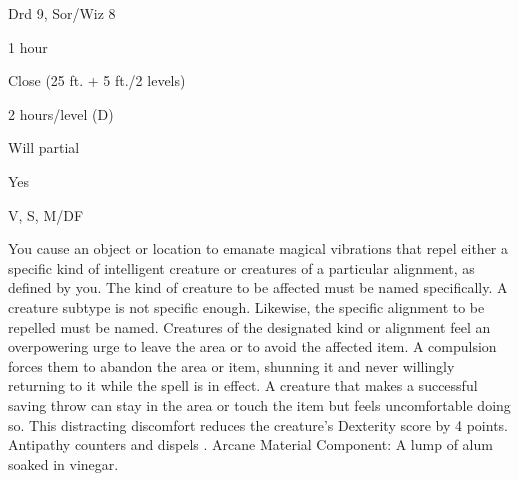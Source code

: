 
\begin{description*}
\item[Level:] Drd 9, Sor/Wiz 8
\item[Casting Time:] 1 hour
\item[Range:] Close (25 ft. + 5 ft./2 levels)
\item[Duration:] 2 hours/level (D)
\item[Saving Throw:] Will partial
\item[Spell Resistance:] Yes
\item[Components:] V, S, M/DF
\end{description*}

You cause an object or location to emanate magical vibrations that repel either
a specific kind of intelligent creature or creatures of a particular alignment,
as defined by you. The kind of creature to be affected must be named specifically.
A creature subtype is not specific enough. Likewise, the specific alignment to
be repelled must be named.
Creatures of the designated kind or alignment feel an overpowering urge to leave
the area or to avoid the affected item.
A compulsion forces them to abandon the area or item, shunning it and never willingly
returning to it while the spell is in effect. A creature that makes a successful
saving throw can stay in the area or touch the item but feels uncomfortable doing
so. This distracting discomfort reduces the creature's Dexterity score by 4 points.
Antipathy counters and dispels .
Arcane Material Component: A lump of alum soaked in vinegar.